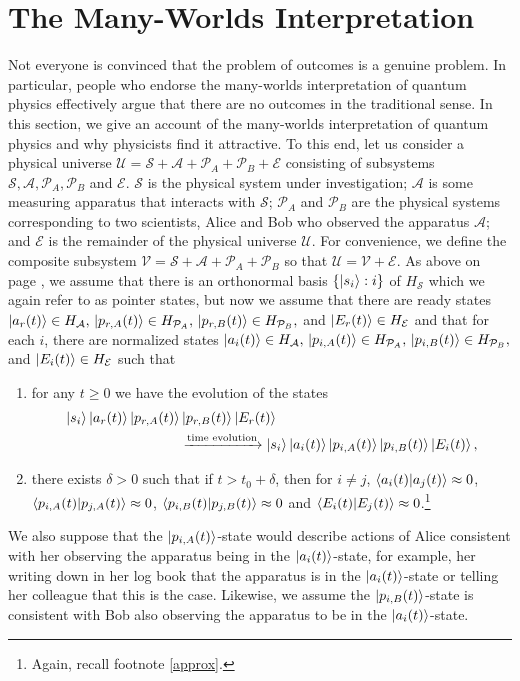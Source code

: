  
    \section{The Many-Worlds Interpretation}\label{manyworldsinterpretation1}
    Not everyone is convinced that the problem of outcomes is a genuine problem. In particular, people who endorse the many-worlds interpretation of quantum physics effectively argue that there are no outcomes in the traditional sense. In this section, we give an account of the many-worlds interpretation of quantum physics and why physicists find it attractive. To this end, let us consider a physical universe $\mathcal{U}=\mathcal{S}+\mathcal{A}+\mathcal{P}_A+\mathcal{P}_B+\mathcal{E}$ consisting of subsystems $\mathcal{S}, \mathcal{A}, \mathcal{P}_A,\mathcal{P}_B$ and $\mathcal{E}$. $\mathcal{S}$ is the physical system under investigation; $\mathcal{A}$ is some measuring apparatus that interacts with $\mathcal{S}$; $\mathcal{P}_A$ and $\mathcal{P}_B$ are the physical systems corresponding to two scientists, Alice and Bob who observed the apparatus $\mathcal{A}$; and $\mathcal{E}$ is the remainder of the physical universe $\mathcal{U}$.  For convenience, we define the composite subsystem $\mathcal{V}=\mathcal{S}+\mathcal{A}+\mathcal{P}_A+\mathcal{P}_B$ so that $\mathcal{U}=\mathcal{V}+\mathcal{E}$. As above on page \pageref{pointer}, we  assume that there is an orthonormal basis $\{\ket{s_i}:i\}$ of $H_\mathcal{S}$ which we again refer to as pointer states, but now we assume that there are ready states $\ket{a_r(t)}\in H_\mathcal{A},\,\ket{p_{r, A}(t)}\in H_{\mathcal{P}_A},\,\ket{p_{r, B}(t)}\in H_{\mathcal{P}_B},$ and $\ket{E_r(t)}\in H_\mathcal{E}$ and that for each $i$, there are normalized states $\ket{a_i(t)}\in H_\mathcal{A},\,\ket{p_{i, A}(t)}\in H_{\mathcal{P}_A},\,\ket{p_{i, B}(t)}\in H_{\mathcal{P}_B},$ and $\ket{E_i(t)}\in H_\mathcal{E}$ such that 
    \begin{enumerate}[noitemsep, nosep, topsep=0pt]
    \item for any $t\geq 0$ we have the evolution of the states 
    \begin{align*}\ket{s_i}\ket{a_r(t)}\ket{p_{r, A}(t)}&\ket{p_{r, B}(t)}\ket{E_r(t)}\\ &\xrightarrow{\text{time evolution}}\ket{s_i}\ket{a_i(t)}\ket{p_{i, A}(t)}\ket{p_{i, B}(t)}\ket{E_i(t)},\end{align*}
    \item there exists $\delta>0$ such that if $t>t_0+\delta$, then for $i\neq j$, $\ip{a_i(t)}{a_j(t)}\approx 0$, $\ip{p_{i, A}(t)}{p_{j, A}(t)}\approx 0$, $\ip{p_{i, B}(t)}{p_{j, B}(t)}\approx 0$ and $\ip{E_i(t)}{E_j(t)}\approx 0$.\footnote{Again, recall footnote \ref{approx}.}
    \end{enumerate}
    We also suppose that the $\ket{p_{i,A}(t)}$-state would describe actions of Alice consistent with her observing the apparatus being in the $\ket{a_i(t)}$-state, for example, her writing down in her log book that the apparatus is in the $\ket{a_i(t)}$-state or telling her colleague that this is the case. Likewise, we assume the $\ket{p_{i,B}(t)}$-state is consistent with Bob also observing the apparatus to be in the $\ket{a_i(t)}$-state.
    
